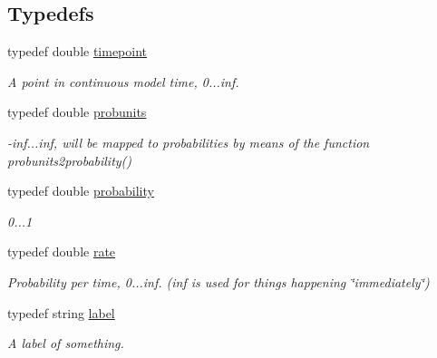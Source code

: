 \subsection*{Typedefs}
\begin{DoxyCompactItemize}
\item 
\mbox{\label{namespacetricl_a720ff6a29f998e11e1d3622fc8df64b1}} 
typedef double \hyperlink{namespacetricl_a720ff6a29f998e11e1d3622fc8df64b1}{timepoint}
\begin{DoxyCompactList}\small\item\em A point in continuous model time, 0...inf. \end{DoxyCompactList}\item 
\mbox{\label{namespacetricl_af8f8f9076e92e1c664ffa96f18d038a5}} 
typedef double \hyperlink{namespacetricl_af8f8f9076e92e1c664ffa96f18d038a5}{probunits}
\begin{DoxyCompactList}\small\item\em -\/inf...inf, will be mapped to probabilities by means of the function probunits2probability() \end{DoxyCompactList}\item 
\mbox{\label{namespacetricl_af2e8973ba58a3dad9061296d8bee16a2}} 
typedef double \hyperlink{namespacetricl_af2e8973ba58a3dad9061296d8bee16a2}{probability}
\begin{DoxyCompactList}\small\item\em 0...1 \end{DoxyCompactList}\item 
\mbox{\label{namespacetricl_ae42d2696f294300a43e0f5edf4875479}} 
typedef double \hyperlink{namespacetricl_ae42d2696f294300a43e0f5edf4875479}{rate}
\begin{DoxyCompactList}\small\item\em Probability per time, 0...inf. (inf is used for things happening \char`\"{}immediately\char`\"{}) \end{DoxyCompactList}\item 
\mbox{\label{namespacetricl_a77e7daffafa870e5786b344119da9b15}} 
typedef string \hyperlink{namespacetricl_a77e7daffafa870e5786b344119da9b15}{label}
\begin{DoxyCompactList}\small\item\em A label of something. \end{DoxyCompactList}\item 

\end{DoxyCompactItemize}
